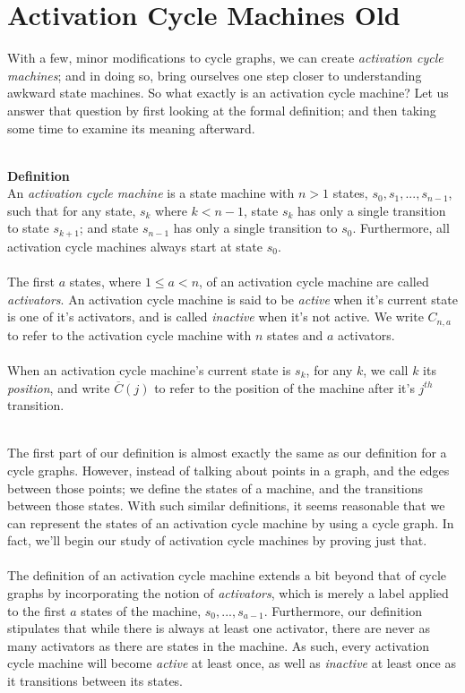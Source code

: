\documentclass[a4paper,12pt]{article}
\begin{document}
\section{Activation Cycle Machines Old}
With a few, minor modifications to cycle graphs, we can create \textit{activation cycle machines}; and in doing so, bring ourselves one step closer to understanding awkward state machines. So what exactly is an activation cycle machine? Let us answer that question by first looking at the formal definition; and then taking some time to examine its meaning afterward.\\
\\
\begin{tcolorbox}
\textbf{Definition}\\
An \textit{activation cycle machine} is a state machine with $n > 1$ states, $s_0, s_1, ..., s_{n-1}$, such that for any state, $s_k$ where $k < n - 1$, state $s_k$ has only a single transition to state $s_{k+1}$; and state $s_{n-1}$ has only a single transition to $s_0$. Furthermore, all activation cycle machines always start at state $s_0$.\\
\\
The first $a$ states, where $1 \leq a < n$, of an activation cycle machine are called \textit{activators}. An activation cycle machine is said to be \textit{active} when it's current state is one of it's activators, and is called \textit{inactive} when it's not active. We write $C_{n,a}$ to refer to the activation cycle machine with $n$ states and $a$ activators.\\
\\
When an activation cycle machine's current state is $s_k$, for any $k$, we call $k$ its \textit{position}, and write $\overline{C}(j)$ to refer to the position of the machine after it's $j^{th}$ transition. 
\end{tcolorbox}
\noindent
\\
The first part of our definition is almost exactly the same as our definition for a cycle graphs. However, instead of talking about points in a graph, and the edges between those points; we define the states of a machine, and the transitions between those states. With such similar definitions, it seems reasonable that we can represent the states of an activation cycle machine by using a cycle graph. In fact, we'll begin our study of activation cycle machines by proving just that.\\
\\
The definition of an activation cycle machine extends a bit beyond that of cycle graphs by incorporating the notion of \textit{activators},  which is merely a label applied to the first $a$ states of the machine, $s_0, ..., s_{a-1}$. Furthermore, our definition stipulates that while there is always at least one activator, there are never as many activators as there are states in the machine. As such, every activation cycle machine will become \textit{active} at least once, as well as \textit{inactive} at least once as it transitions between its states.\\
\end{document}
